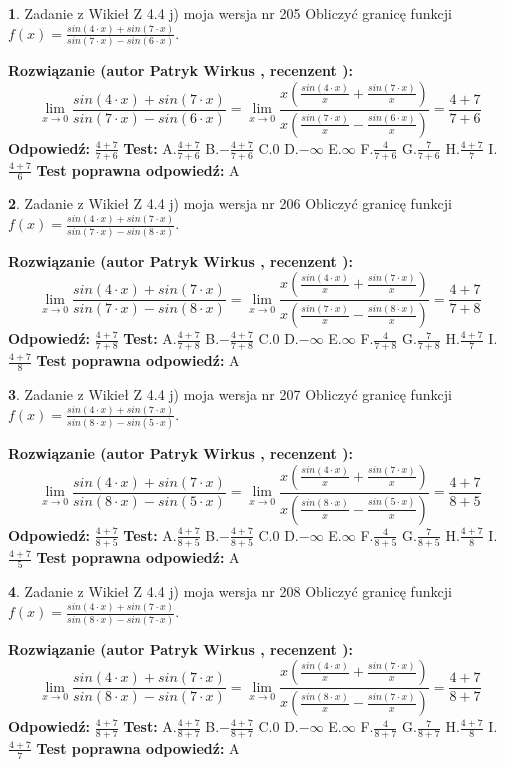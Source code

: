 \documentclass[12pt, a4paper]{article}
\theoremstyle{definition} %
\newtheorem{zad}{}
\newcommand{\zadStart}[1]{\begin{zad}#1\newline}
\newcommand{\zadStop}{\end{zad}}
\newcommand{\rozwStart}[2]{\noindent \textbf{Rozwiązanie (autor #1 , recenzent #2): }\newline}
\newcommand{\rozwStop}{\newline}
\newcommand{\odpStart}{\noindent \textbf{Odpowiedź:}\newline}
\newcommand{\odpStop}{\newline}
\newcommand{\testStart}{\noindent \textbf{Test:}\newline}
\newcommand{\testStop}{\newline}
\newcommand{\kluczStart}{\noindent \textbf{Test poprawna odpowiedź:}\newline}
\newcommand{\kluczStop}{\newline}
\begin{document}
\zadStart{Zadanie z Wikieł Z 4.4 j) moja wersja nr 205}
Obliczyć granicę funkcji $f(x)=\frac{sin(4\cdot x) +sin(7\cdot x)}{sin(7\cdot x) -sin(6\cdot x)}$.
\zadStop
\rozwStart{Patryk Wirkus}{}
$$\lim\limits_{x\to 0}\frac{sin(4\cdot x) +sin(7\cdot x)}{sin(7\cdot x) -sin(6\cdot x)}=\lim\limits_{x\to 0}\frac{x(\frac{sin(4\cdot x)}{x}+\frac{sin(7\cdot x)}{x})}{x(\frac{sin(7\cdot x)}{x}-\frac{sin(6\cdot x)}{x})}=\frac{4+7}{7+6}$$
\rozwStop
\odpStart
$\frac{4+7}{7+6}$
\odpStop
\testStart
A.$\frac{4+7}{7+6}$
B.$-\frac{4+7}{7+6}$
C.$0$
D.$-\infty$
E.$\infty$
F.$\frac{4}{7+6}$
G.$\frac{7}{7+6}$
H.$\frac{4+7}{7}$
I.$\frac{4+7}{6}$
\testStop
\kluczStart
A
\kluczStop



\zadStart{Zadanie z Wikieł Z 4.4 j) moja wersja nr 206}
Obliczyć granicę funkcji $f(x)=\frac{sin(4\cdot x) +sin(7\cdot x)}{sin(7\cdot x) -sin(8\cdot x)}$.
\zadStop
\rozwStart{Patryk Wirkus}{}
$$\lim\limits_{x\to 0}\frac{sin(4\cdot x) +sin(7\cdot x)}{sin(7\cdot x) -sin(8\cdot x)}=\lim\limits_{x\to 0}\frac{x(\frac{sin(4\cdot x)}{x}+\frac{sin(7\cdot x)}{x})}{x(\frac{sin(7\cdot x)}{x}-\frac{sin(8\cdot x)}{x})}=\frac{4+7}{7+8}$$
\rozwStop
\odpStart
$\frac{4+7}{7+8}$
\odpStop
\testStart
A.$\frac{4+7}{7+8}$
B.$-\frac{4+7}{7+8}$
C.$0$
D.$-\infty$
E.$\infty$
F.$\frac{4}{7+8}$
G.$\frac{7}{7+8}$
H.$\frac{4+7}{7}$
I.$\frac{4+7}{8}$
\testStop
\kluczStart
A
\kluczStop



\zadStart{Zadanie z Wikieł Z 4.4 j) moja wersja nr 207}
Obliczyć granicę funkcji $f(x)=\frac{sin(4\cdot x) +sin(7\cdot x)}{sin(8\cdot x) -sin(5\cdot x)}$.
\zadStop
\rozwStart{Patryk Wirkus}{}
$$\lim\limits_{x\to 0}\frac{sin(4\cdot x) +sin(7\cdot x)}{sin(8\cdot x) -sin(5\cdot x)}=\lim\limits_{x\to 0}\frac{x(\frac{sin(4\cdot x)}{x}+\frac{sin(7\cdot x)}{x})}{x(\frac{sin(8\cdot x)}{x}-\frac{sin(5\cdot x)}{x})}=\frac{4+7}{8+5}$$
\rozwStop
\odpStart
$\frac{4+7}{8+5}$
\odpStop
\testStart
A.$\frac{4+7}{8+5}$
B.$-\frac{4+7}{8+5}$
C.$0$
D.$-\infty$
E.$\infty$
F.$\frac{4}{8+5}$
G.$\frac{7}{8+5}$
H.$\frac{4+7}{8}$
I.$\frac{4+7}{5}$
\testStop
\kluczStart
A
\kluczStop



\zadStart{Zadanie z Wikieł Z 4.4 j) moja wersja nr 208}
Obliczyć granicę funkcji $f(x)=\frac{sin(4\cdot x) +sin(7\cdot x)}{sin(8\cdot x) -sin(7\cdot x)}$.
\zadStop
\rozwStart{Patryk Wirkus}{}
$$\lim\limits_{x\to 0}\frac{sin(4\cdot x) +sin(7\cdot x)}{sin(8\cdot x) -sin(7\cdot x)}=\lim\limits_{x\to 0}\frac{x(\frac{sin(4\cdot x)}{x}+\frac{sin(7\cdot x)}{x})}{x(\frac{sin(8\cdot x)}{x}-\frac{sin(7\cdot x)}{x})}=\frac{4+7}{8+7}$$
\rozwStop
\odpStart
$\frac{4+7}{8+7}$
\odpStop
\testStart
A.$\frac{4+7}{8+7}$
B.$-\frac{4+7}{8+7}$
C.$0$
D.$-\infty$
E.$\infty$
F.$\frac{4}{8+7}$
G.$\frac{7}{8+7}$
H.$\frac{4+7}{8}$
I.$\frac{4+7}{7}$
\testStop
\kluczStart
A
\kluczStop
\end{document}
